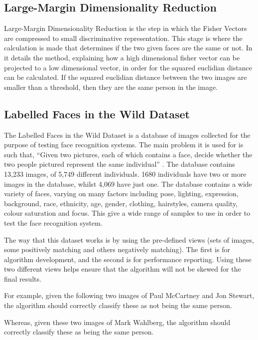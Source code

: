 \documentclass[12pt, a4paper]{article}
\begin{document}
\subsection{Large-Margin Dimensionality Reduction}

Large-Margin Dimensionality Reduction is the step in which the Fisher Vectors are compressed to small discriminative representation. This stage is where the calculation is made that determines if the two given faces are the same or not. In \cite{highlbpsift} it details the method, explaining how a high dimensional fisher vector can be projected to a low dimensional vector, in order for the squared euclidian distance can be calculated. If the squared euclidian distance between the two images are smaller than a threshold, then they are the same person in the image.
        
  \subsection{Labelled Faces in the Wild Dataset}

The Labelled Faces in the Wild Dataset is a database of images collected for the purpose of testing face recognition systems. The main problem it is used for is such that, “Given two pictures, each of which contains a face, decide whether the two people pictured represent the same individual” \cite{labelledFaces}. The database contains 13,233 images, of 5,749 different individuals. 1680 individuals have two or more images in the database, whilst 4,069 have just one. The database contains a wide variety of faces, varying on many factors including pose, lighting, expression, background, race, ethnicity, age, gender, clothing, hairstyles, camera quality, colour saturation and focus. This give a wide range of samples to use in order to test the face recognition system.

The way that this dataset works is by using the pre-defined views (sets of images, some positively matching and others negatively matching). The first is for algorithm development, and the second is for performance reporting. Using these two different views helps ensure that the algorithm will not be skewed for the final results.

For example, given the following two images of Paul McCartney and Jon Stewart, the algorithm should correctly classify these as not being the same person. 

Whereas, given these two images of Mark Wahlberg, the algorithm should correctly classify these as being the same person.
\end{document}

